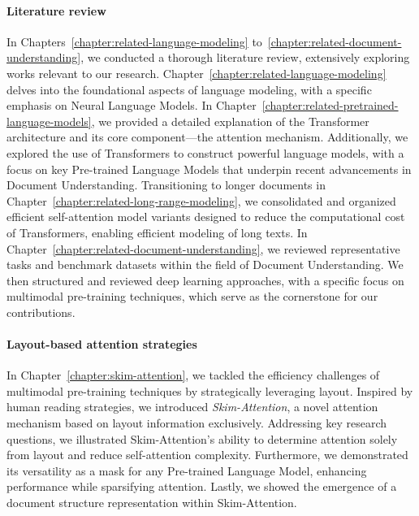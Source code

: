 
\paragraph{Literature review}

In Chapters~\ref{chapter:related-language-modeling} to~\ref{chapter:related-document-understanding}, we conducted a thorough literature review, extensively exploring works relevant to our research. Chapter~\ref{chapter:related-language-modeling} delves into the foundational aspects of language modeling, with a specific emphasis on Neural Language Models. In Chapter~\ref{chapter:related-pretrained-language-models}, we provided a detailed explanation of the Transformer architecture and its core component—the attention mechanism. Additionally, we explored the use of Transformers to construct powerful language models, with a focus on key Pre-trained Language Models that underpin recent advancements in Document Understanding. Transitioning to longer documents in Chapter~\ref{chapter:related-long-range-modeling}, we consolidated and organized efficient self-attention model variants designed to reduce the computational cost of Transformers, enabling efficient modeling of long texts. In Chapter~\ref{chapter:related-document-understanding}, we reviewed representative tasks and benchmark datasets within the field of Document Understanding. We then structured and reviewed deep learning approaches, with a specific focus on multimodal pre-training techniques, which serve as the cornerstone for our contributions.


\paragraph{Layout-based attention strategies}

In Chapter~\ref{chapter:skim-attention}, we tackled the efficiency challenges of multimodal pre-training techniques by strategically leveraging layout. Inspired by human reading strategies, we introduced \textit{Skim-Attention}, a novel attention mechanism based on layout information exclusively. Addressing key research questions, we illustrated Skim-Attention's ability to determine attention solely from layout and reduce self-attention complexity. Furthermore, we demonstrated its versatility as a mask for any Pre-trained Language Model, enhancing performance while sparsifying attention. Lastly, we showed the emergence of a document structure representation within Skim-Attention.

